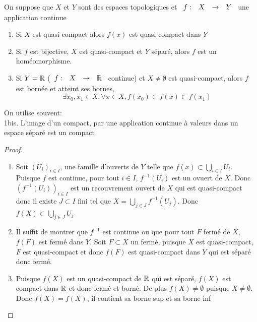 \documentclass[]{report}
\begin{document}
    \begin{tm}{}{}
        On suppose que $X$ et $Y$ sont des espaces topologiques et $\begin{array}{ccccc} f : & X & \to & Y \end{array}$ une application continue
        \begin{enumerate}
            \item Si $X$ est quasi-compact alors $f(x)$ est quasi compact dans $Y$
            \item Si $f$ est bijective, $X$ est quasi-compact et $Y$ séparé, alors $f$ est un homéomorphisme.
            \item Si $Y=\mathbb{R}$ ($\begin{array}{ccccc} f : & X & \to & \mathbb{R} \end{array}$ continue) et $X\neq \emptyset$ est quasi-compact, alors $f$ est bornée et atteint ses bornes,
            \[\exists x_0,x_1\in X,\forall x\in X, f(x_0)\subset f(x)\subset f(x_1)\]
        \end{enumerate}
    \end{tm}

    \begin{re}{}{}
        On utilise souvent:\\
        1bis. L'image d'un compact, par une application continue à valeurs dans un espace séparé est un compact
    \end{re}

    \begin{proof}
        \begin{enumerate}
            \item Soit $(U_i)_{i\in I}$, une famille  d'ouverts de $Y$ telle que $f(x)\subset \bigcup_{i\in I}U_i$. Puisque $f$ est continue, pour tout $i\in I$, $f^{-1}(U_i)$ est un ovuert de $X$. Donc $(f^{-1}(U_i))_{i\in I}$ est un recouvrement ouvert de $X$ qui est quasi-compact donc il existe $J\subset I$ fini tel que $X=\bigcup_{j\in J}f^{-1}(U_j)$. Donc $f(X)\subset \bigcup_{j\in J} U_j$
            \item Il suffit de montrer que $f^{-1}$ est continue ou que pour tout $F$ fermé de $X$, $f(F)$ est fermé dans $Y$. Soit $F\subset X$ un fermé, puisque $X$ est quasi-compact, $F$ est quasi-compact et donc $f(F)$ est quasi-compact dans $Y$ qui est séparé donc fermé.
            \item Puisque $f(X)$ est un quasi-compact de $\mathbb{R}$ qui est séparé, $f(X)$ est compact dans $\mathbb{R}$ et donc fermé et borné. De plus $f(X)\neq \emptyset$ puisque $X\neq \emptyset$. Donc $f(X)=\overline{f(X)}$, il contient sa borne sup et sa borne inf
        \end{enumerate}
    \end{proof}
\end{document}
